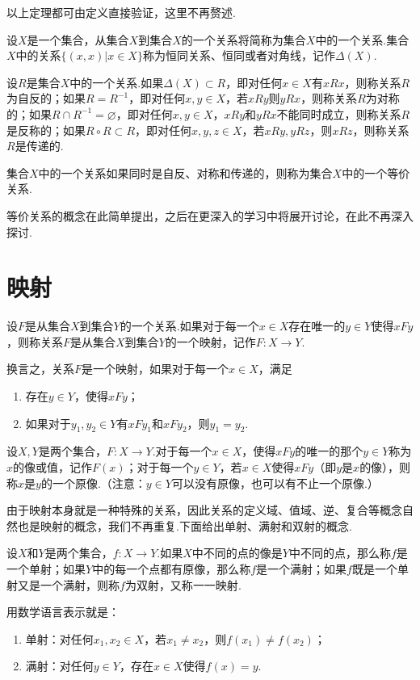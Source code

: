 以上定理都可由定义直接验证，这里不再赘述.
\begin{definition}
	设$X$是一个集合，从集合$X$到集合$X$的一个关系将简称为集合$X$中的一个关系.集合$X$中的关系$\{(x,x)|x\in X\}$称为{\heiti 恒同关系}、{\heiti 恒同}或者{\heiti 对角线}，记作$\Delta(X)$.
\end{definition}
\begin{definition}[等价关系]
	设$R$是集合$X$中的一个关系.如果$\Delta(X)\subset R$，即对任何$x\in X$有$xRx$，则称关系$R$为{\heiti 自反的}；如果$R=R^{-1}$，即对任何$x,y\in X$，若$xRy$则$yRx$，则称关系$R$为{\heiti 对称的}；如果$R\cap R^{-1}=\varnothing$，即对任何$x,y\in X$，$xRy$和$yRx$不能同时成立，则称关系$R$是{\heiti 反称的}；如果$R\circ R\subset R$，即对任何$x,y,z\in X$，若$xRy,yRz$，则$xRz$，则称关系$R$是{\heiti 传递的}.
	
	集合$X$中的一个关系如果同时是自反、对称和传递的，则称为集合$X$中的一个{\heiti 等价关系}.
\end{definition}
等价关系的概念在此简单提出，之后在更深入的学习中将展开讨论，在此不再深入探讨.
\section{映射}
\begin{definition}[映射]
	设$F$是从集合$X$到集合$Y$的一个关系.如果对于每一个$x\in X$存在唯一的$y\in Y$使得$xFy$，则称关系$F$是从集合$X$到集合$Y$的一个{\heiti 映射}，记作$F:X\rightarrow Y$.
\end{definition}
换言之，关系$F$是一个映射，如果对于每一个$x\in X$，满足
\begin{enumerate}[(1)]
	\item 存在$y\in Y$，使得$xFy$；
	\item 如果对于$y_1,y_2\in Y$有$xFy_1$和$xFy_2$，则$y_1=y_2$.
\end{enumerate}
\begin{definition}[像与原像]
	设$X,Y$是两个集合，$F:X\rightarrow Y$.对于每一个$x\in X$，使得$xFy$的唯一的那个$y\in Y$称为$x$的{\heiti 像}或{\heiti 值}，记作$F(x)$；对于每一个$y\in Y$，若$x\in X$使得$xFy$（即$y$是$x$的像），则称$x$是$y$的一个{\heiti 原像}.（注意：$y\in Y$可以没有原像，也可以有不止一个原像.）
\end{definition}
由于映射本身就是一种特殊的关系，因此关系的定义域、值域、逆、复合等概念自然也是映射的概念，我们不再重复.下面给出单射、满射和双射的概念.
\begin{definition}
	设$X$和$Y$是两个集合，$f:X\rightarrow Y$.如果$X$中不同的点的像是$Y$中不同的点，那么称$f$是一个{\heiti 单射}；如果$Y$中的每一个点都有原像，那么称$f$是一个{\heiti 满射}；如果$f$既是一个单射又是一个满射，则称$f$为{\heiti 双射}，又称{\heiti 一一映射}.
\end{definition}
用数学语言表示就是：
\begin{enumerate}[(1)]
	\item 单射：对任何$x_1,x_2\in X$，若$x_1\neq x_2$，则$f(x_1)\neq f(x_2)$；
	\item 满射：对任何$y\in Y$，存在$x\in X$使得$f(x)=y$.
\end{enumerate}


